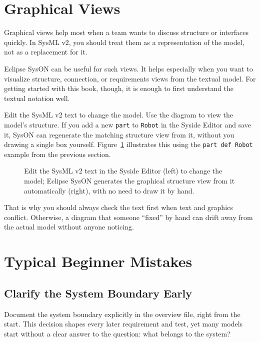 \section{Graphical Views}
Graphical views help most when a team wants to discuss structure or interfaces quickly. In SysML v2, you should treat them as a representation of the model, not as a replacement for it.

Eclipse SysON can be useful for such views. It helps especially when you want to visualize structure, connection, or requirements views from the textual model. For getting started with this book, though, it is enough to first understand the textual notation well.

Edit the SysML v2 text to change the model. Use the diagram to view the model's structure. If you add a new \texttt{part} to \texttt{Robot} in the Syside Editor and save it, SysON can regenerate the matching structure view from it, without you drawing a single box yourself. Figure~\ref{fig:kap04-syside-syson-sync} illustrates this using the \texttt{part def Robot} example from the previous section.

\begin{figure}[H]
  \centering
  \caption{Edit the SysML v2 text in the Syside Editor (left) to change the model; Eclipse SysON generates the graphical structure view from it automatically (right), with no need to draw it by hand.}
  \label{fig:kap04-syside-syson-sync}
\end{figure}

\begin{hinweisbox}
That is why you should always check the text first when text and graphics conflict. Otherwise, a diagram that someone \enquote{fixed} by hand can drift away from the actual model without anyone noticing.
\end{hinweisbox}

\section{Typical Beginner Mistakes}
\subsection{Clarify the System Boundary Early}
Document the system boundary explicitly in the overview file, right from the start. This decision shapes every later requirement and test, yet many models start without a clear answer to the question: what belongs to the system?

